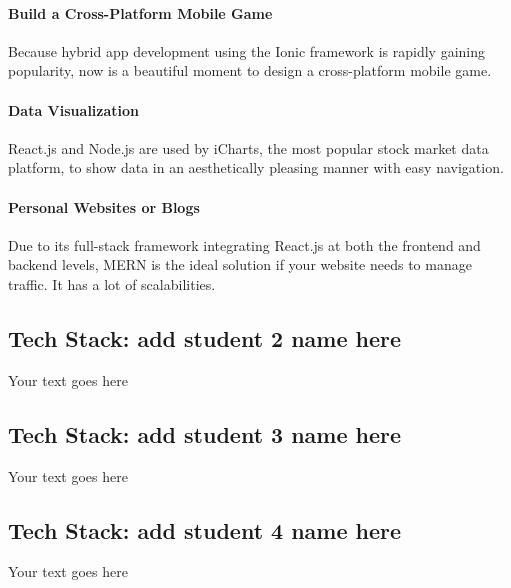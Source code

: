 \documentclass[a4paper, 11pt]{report}
\begin{document}
\paragraph{Build a Cross-Platform Mobile Game}
Because hybrid app development using the Ionic framework is rapidly gaining popularity, now is a beautiful moment to design a cross-platform mobile game.\\
\paragraph{Data Visualization}
React.js and Node.js are used by iCharts, the most popular stock market data platform, to show data in an aesthetically pleasing manner with easy navigation.\\
\paragraph{Personal Websites or Blogs}
Due to its full-stack framework integrating React.js at both the frontend and backend levels, MERN is the ideal solution if your website needs to manage traffic. It has a lot of scalabilities.\cite{(Kapoor, 2021)}\\


\newpage
\subsection{Tech Stack: add student 2 name here}

Your text goes here


\newpage
\subsection{Tech Stack: add student 3 name here}

Your text goes here


\newpage
\subsection{Tech Stack: add student 4 name here}

Your text goes here
\end{document}
